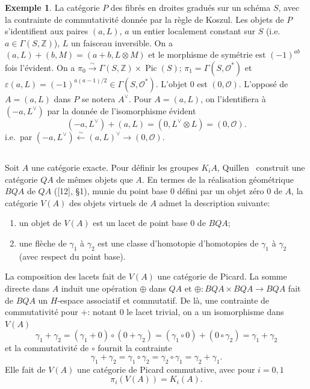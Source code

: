 \documentclass[12pt,a4paper]{article}
\theoremstyle{plain}
\theoremstyle{definition}
\newtheorem{example}[theorem]{Exemple}
\DeclareMathOperator{\Pic}{Pic}
\newcommand{\ZZ}{\mathbb{Z}}
\newcommand{\Oo}{\mathscr{O}}
\begin{document}
\begin{example}
La cat\'egorie $P$ des fibr\'es en droites gradu\'es sur un sch\'ema $S$, avec
la contrainte de commutativit\'e donn\'ee par la r\`egle de Koszul. Les objets de $P$
s'identifient aux paires $(a, L)$, $a$ un entier localement constant sur $S$ (i.e.\ $a \in \Gamma(S, \ZZ)$), $L$ un faisceau inversible. On a $(a, L) + (b, M) = (a + b, L \otimes M)$
et le morphisme de sym\'etrie est $(-1)^{ab}$ fois l'\'evident. On a $\pi_0 \xrightarrow{\sim} \Gamma(S, \ZZ) \times \Pic(S)$;
$\pi_1 = \Gamma(S, \Oo^*)$ et $\varepsilon(a, L) = (-1)^{a(a-1)/2} \in \Gamma(S, \Oo^*)$. L'objet $0$ est $(0, \Oo)$. L'oppos\'e de $A = (a, L)$
dans $P$ se notera $A^\vee$. Pour $A = (a, L)$, on l'identifiera \`a $(-a, L^\vee)$ par
la donn\'ee de l'isomorphisme \'evident
\[
(-a, L^\vee) + (a, L) = (0, L^\vee \otimes L) = (0, \Oo) .
\]
i.e.\ par $(-a, L^\vee) \xleftarrow{\sim} (a, L)^\vee \to (0, \Oo)$.
\end{example}

\subsection{}

Soit $A$ une cat\'egorie exacte. Pour d\'efinir les groupes $K_i A$, Quillen~\cite{12}
construit une cat\'egorie $QA$ de m\^emes objets que $A$. En termes de la r\'ealisation
g\'eom\'etrique $BQA$ de $QA$ ([12], \S1), munie du point base $0$ d\'efini par un objet
z\'ero $0$ de $A$, la cat\'egorie $V(A)$ des objets virtuels de $A$ admet la description
suivante:

\begin{enumerate}[label=(\alph*)]
\item un objet de $V(A)$ est un lacet de point base $0$ de $BQA$;
\item une fl\`eche de $\gamma_1$ \`a $\gamma_2$ est une classe d'homotopie d'homotopies de
$\gamma_1$ \`a $\gamma_2$ (avec respect du point base).
\end{enumerate}
La composition des lacets fait de $V(A)$ une cat\'egorie de Picard. La somme
directe dans $A$ induit une op\'eration $\oplus$ dans $QA$ et $\oplus: BQA \times BQA \to BQA$
fait de $BQA$ un $H$-espace associatif et commutatif. De l\`a, une contrainte de
commutativit\'e pour $+$: notant $0$ le lacet trivial, on a un isomorphisme dans $V(A)$
\begin{equation}\label{eq:4.2.1}
\gamma_1 + \gamma_2 = (\gamma_1 + 0) \circ (0 + \gamma_2) = (\gamma_1 \circ 0) + (0 \circ \gamma_2) = \gamma_1 + \gamma_2
\end{equation}
et la commutativit\'e de $\circ$ fournit la contrainte
\begin{equation}\label{eq:4.2.2}
\gamma_1 + \gamma_2 = \gamma_1 \circ \gamma_2 = \gamma_2 \circ \gamma_1 = \gamma_2 + \gamma_1 .
\end{equation}
Elle fait de $V(A)$ une cat\'egorie de Picard commutative, avec pour $i = 0, 1$
\[
\pi_i(V(A)) = K_i(A) .
\]
\end{document}
